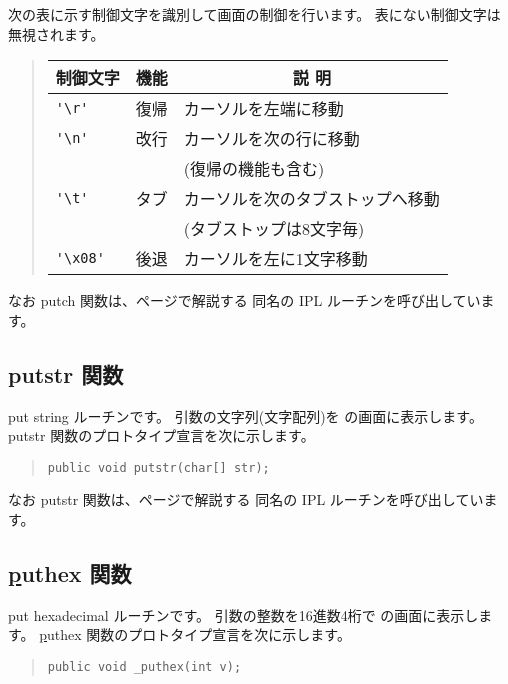 次の表に示す制御文字を識別して画面の制御を行います。
表にない制御文字は無視されます。

\begin{quote}
\begin{tabular}{l|l|l}
\hline
\multicolumn{1}{c|}{制御文字} & \multicolumn{1}{c|}{機能} &
\multicolumn{1}{c}{説 明} \\
\hline
\verb/'\r'/  & 復帰 & カーソルを左端に移動             \\
\verb/'\n'/  & 改行 & カーソルを次の行に移動           \\
              &      & (復帰の機能も含む)               \\
\verb/'\t'/  & タブ & カーソルを次のタブストップへ移動 \\
              &      & (タブストップは8文字毎)          \\
\verb/'\x08'/ & 後退 & カーソルを左に1文字移動          \\
\end{tabular}
\end{quote}

なお putch 関数は、\pageref{app:ipl}ページで解説する
同名の IPL ルーチンを呼び出しています。

\subsection{putstr 関数}

put string ルーチンです。
引数の文字列(文字配列)を \tac の画面に表示します。
putstr 関数のプロトタイプ宣言を次に示します。

\begin{quote}
\begin{verbatim}
public void putstr(char[] str);
\end{verbatim}
\end{quote}

なお putstr 関数は、\pageref{app:ipl}ページで解説する
同名の IPL ルーチンを呼び出しています。

\subsection{\ul puthex 関数}
put hexadecimal ルーチンです。
引数の整数を16進数4桁で \tac の画面に表示します。
\ul puthex 関数のプロトタイプ宣言を次に示します。

\begin{quote}
\begin{verbatim}
public void _puthex(int v);
\end{verbatim}
\end{quote}

